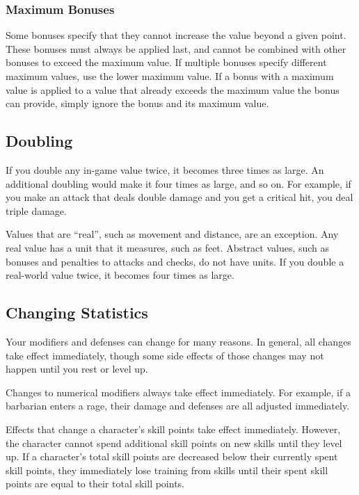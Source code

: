         \subsubsection{Maximum Bonuses}\label{Ability Limits}
            Some bonuses specify that they cannot increase the value beyond a given point.
            These bonuses must always be applied last, and cannot be combined with other bonuses to exceed the maximum value.
            If multiple bonuses specify different maximum values, use the lower maximum value.
            If a bonus with a maximum value is applied to a value that already exceeds the maximum value the bonus can provide, simply ignore the bonus and its maximum value.

    \subsection{Doubling}\label{Doubling}
        If you double any in-game value twice, it becomes three times as large. An additional doubling would make it four times as large, and so on. For example, if you make an attack that deals double damage and you get a critical hit, you deal triple damage.

         Values that are ``real'', such as movement and distance, are an exception.
        Any real value has a unit that it measures, such as feet.
        Abstract values, such as bonuses and penalties to attacks and checks, do not have units.
        If you double a real-world value twice, it becomes four times as large.

    \subsection{Changing Statistics}

        Your modifiers and defenses can change for many reasons.
        In general, all changes take effect immediately, though some side effects of those changes may not happen until you rest or level up.

         Changes to numerical modifiers always take effect immediately.
        For example, if a barbarian enters a rage, their damage and defenses are all adjusted immediately.

         Effects that change a character's skill points take effect immediately.
        However, the character cannot spend additional skill points on new skills until they level up.
        If a character's total skill points are decreased below their currently spent skill points, they immediately lose training from skills until their spent skill points are equal to their total skill points.

